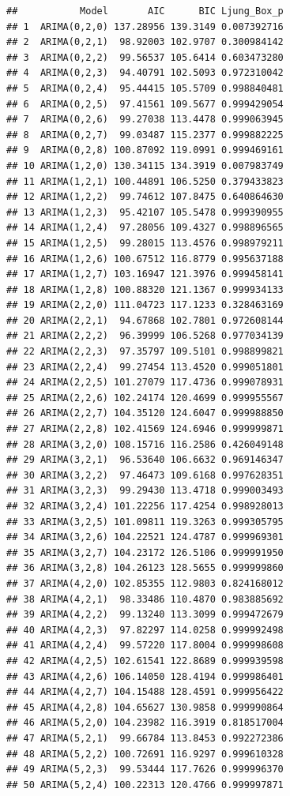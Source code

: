 \documentclass[
]{article}
\begin{document}
\begin{verbatim}
##           Model       AIC      BIC Ljung_Box_p
## 1  ARIMA(0,2,0) 137.28956 139.3149 0.007392716
## 2  ARIMA(0,2,1)  98.92003 102.9707 0.300984142
## 3  ARIMA(0,2,2)  99.56537 105.6414 0.603473280
## 4  ARIMA(0,2,3)  94.40791 102.5093 0.972310042
## 5  ARIMA(0,2,4)  95.44415 105.5709 0.998840481
## 6  ARIMA(0,2,5)  97.41561 109.5677 0.999429054
## 7  ARIMA(0,2,6)  99.27038 113.4478 0.999063945
## 8  ARIMA(0,2,7)  99.03487 115.2377 0.999882225
## 9  ARIMA(0,2,8) 100.87092 119.0991 0.999469161
## 10 ARIMA(1,2,0) 130.34115 134.3919 0.007983749
## 11 ARIMA(1,2,1) 100.44891 106.5250 0.379433823
## 12 ARIMA(1,2,2)  99.74612 107.8475 0.640864630
## 13 ARIMA(1,2,3)  95.42107 105.5478 0.999390955
## 14 ARIMA(1,2,4)  97.28056 109.4327 0.998896565
## 15 ARIMA(1,2,5)  99.28015 113.4576 0.998979211
## 16 ARIMA(1,2,6) 100.67512 116.8779 0.995637188
## 17 ARIMA(1,2,7) 103.16947 121.3976 0.999458141
## 18 ARIMA(1,2,8) 100.88320 121.1367 0.999934133
## 19 ARIMA(2,2,0) 111.04723 117.1233 0.328463169
## 20 ARIMA(2,2,1)  94.67868 102.7801 0.972608144
## 21 ARIMA(2,2,2)  96.39999 106.5268 0.977034139
## 22 ARIMA(2,2,3)  97.35797 109.5101 0.998899821
## 23 ARIMA(2,2,4)  99.27454 113.4520 0.999051801
## 24 ARIMA(2,2,5) 101.27079 117.4736 0.999078931
## 25 ARIMA(2,2,6) 102.24174 120.4699 0.999955567
## 26 ARIMA(2,2,7) 104.35120 124.6047 0.999988850
## 27 ARIMA(2,2,8) 102.41569 124.6946 0.999999871
## 28 ARIMA(3,2,0) 108.15716 116.2586 0.426049148
## 29 ARIMA(3,2,1)  96.53640 106.6632 0.969146347
## 30 ARIMA(3,2,2)  97.46473 109.6168 0.997628351
## 31 ARIMA(3,2,3)  99.29430 113.4718 0.999003493
## 32 ARIMA(3,2,4) 101.22256 117.4254 0.998928013
## 33 ARIMA(3,2,5) 101.09811 119.3263 0.999305795
## 34 ARIMA(3,2,6) 104.22521 124.4787 0.999969301
## 35 ARIMA(3,2,7) 104.23172 126.5106 0.999991950
## 36 ARIMA(3,2,8) 104.26123 128.5655 0.999999860
## 37 ARIMA(4,2,0) 102.85355 112.9803 0.824168012
## 38 ARIMA(4,2,1)  98.33486 110.4870 0.983885692
## 39 ARIMA(4,2,2)  99.13240 113.3099 0.999472679
## 40 ARIMA(4,2,3)  97.82297 114.0258 0.999992498
## 41 ARIMA(4,2,4)  99.57220 117.8004 0.999998608
## 42 ARIMA(4,2,5) 102.61541 122.8689 0.999939598
## 43 ARIMA(4,2,6) 106.14050 128.4194 0.999986401
## 44 ARIMA(4,2,7) 104.15488 128.4591 0.999956422
## 45 ARIMA(4,2,8) 104.65627 130.9858 0.999990864
## 46 ARIMA(5,2,0) 104.23982 116.3919 0.818517004
## 47 ARIMA(5,2,1)  99.66784 113.8453 0.992272386
## 48 ARIMA(5,2,2) 100.72691 116.9297 0.999610328
## 49 ARIMA(5,2,3)  99.53444 117.7626 0.999996370
## 50 ARIMA(5,2,4) 100.22313 120.4766 0.999997871

\end{verbatim}
\end{document}

